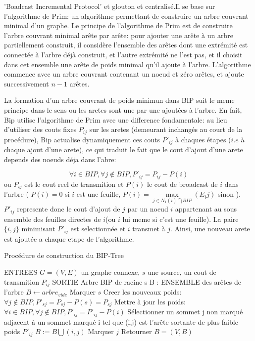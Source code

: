 'Boadcast Incremental Protocol' et glouton et centralisé.Il se base sur l'algorithme de Prim: un algorithme permettant de construire un arbre couvrant minimal d'un graphe. Le principe de l'algorithme de Prim est de construire l'arbre couvrant minimal arête par arête: pour ajouter une 
arête à un arbre partiellement construit, il considère l'ensemble des arêtes dont une extrémité est
connectée à l'arbre déjà construit, et l'autre extrémité ne l'est pas, et
il choisit dans cet ensemble une arête de poids minimal qu'il ajoute à l'arbre. L'algorithme commence avec un arbre couvrant contenant un noeud et zéro arêtes, et ajoute successivement $n-1$ arêtes.

La formation d'un arbre couvrant de poids minimun dans BIP suit le meme principe dans le sens ou les aretes sont une par une ajoutées à l'arbre.
En fait, Bip utilise l'algorithme de Prim avec une difference fondamentale: au lieu d'utiliser des couts fixes $P_{ij}$ sur les aretes (demeurant inchangés au court de la procédure),
Bip actualise dynamiquement ces couts $P'_{ij}$ à chaques étapes ($i.e$ à chaque ajout d'une arete), ce qui traduit le fait que le cout d'ajout d'une arete depends des noeuds déja dans l'abre:

$$ \forall i \in BIP, \forall j \notin BIP, P'_{ij}=P_{ij}-P(i)$$
ou $P_{ij}$ est le cout reel de transmition et $P(i)$ le cout de broadcast de $i$ dans l'arbre ( $P(i)=0$ si $i$ est une feuille, $P(i)=\max\limits_{j\in N_1(i)\bigcap BIP}(E_ij)$ sinon ). $P'_{ij}$ represente donc le cout d'ajout de $j$ par un noeud $i$ appartenant au sous ensemble des feuilles
directes de $i$(ou $i$ lui meme si c'est une feuille). La paire $\{i,j\}$ minimisant $P'_{ij}$ est selectionnée et $i$ transmet à $j$. Ainsi, une nouveau arete est ajoutée a chaque etape de l'algorithme.\\



\begin{algorithm}[h]
\caption{Procédure de construction du BIP-Tree}
\label{algo_BIP_tree}
\begin{algorithmic}
\STATE ENTREES  $G=(V,E)$ un graphe connexe, $s$ une source, un cout de transmition $P_{ij}$
\STATE SORTIE  Arbre BIP de racine s
\STATE B : ENSEMBLE des arêtes de l'arbre
\STATE  $B \leftarrow arbre_{vide}$
\STATE Marquer $s$
\STATE Creer les nouveaux poids: $\forall j \notin BIP, P'_{sj}=P_{sj}-P(s)=P_{sj}$
   \STATE Mettre à jour les poids:  $ \forall i \in BIP, \forall j \notin BIP, P'_{ij}=P'_{ij}-P(i)$
   \STATE Sélectionner un sommet j non marqué adjacent à un sommet marqué i tel que (i,j) est l'arête sortante de plus faible poids $P'_{ij}$
   \STATE $B := B\bigcup   {(i,j)}$
   \STATE Marquer $j$
\ENDWHILE
\STATE Retourner $B=(V,B)$
\end{algorithmic}
\end{algorithm}

